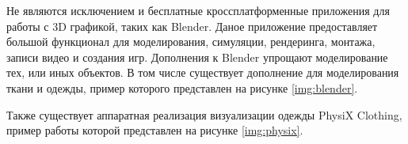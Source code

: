 Не являются исключением и бесплатные кроссплатформенные приложения для работы с
3D графикой, таких как Blender. Даное приложение предоставляет большой
функционал для моделирования, симуляции, рендеринга, монтажа, записи видео и
создания игр. Дополнения к Blender упрощают моделирование тех, или иных
объектов. В том числе существует дополнение для моделирования ткани и одежды,
пример которого представлен на рисунке \ref{img:blender}.


Также существует аппаратная реализация визуализации одежды PhysiX
Clothing\cite{site03}, пример работы которой представлен на рисунке
\ref{img:physix}.


